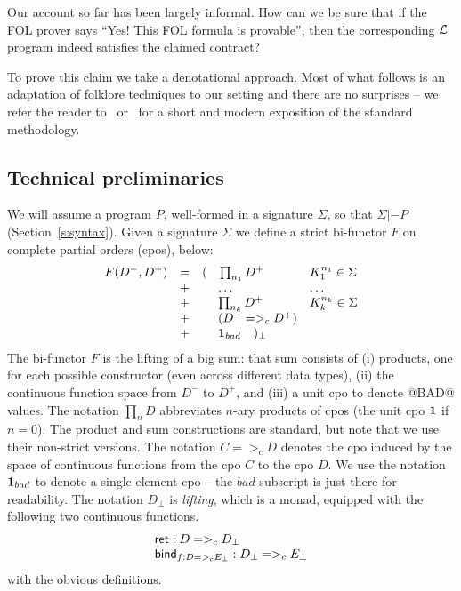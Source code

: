 Our account so far has been largely informal.  How can we be sure
that if the FOL prover says ``Yes!  This FOL formula is provable'', then
the corresponding $\cal L$ program indeed satisfies the claimed contract?

To prove this claim we take a denotational approach.  
Most of what follows is an adaptation of folklore techniques to
our setting and there are no surprises -- we refer the reader
to~\cite{winskel} or~\cite{benton+:coq-domains} for a short and modern
exposition of the standard methodology.

\subsection{Technical preliminaries}

We will assume a program $P$, well-formed in a signature $\Sigma$, so
that $\Sigma |- P$ (Section~\ref{s:syntax}).  
Given a signature $\Sigma$ we define a strict
bi-functor $F$ on complete partial orders (cpos), below:
\[\begin{array}{lclll}
  F(D^{-},D^{+}) & = & ( \quad{\prod_{n_1}{D^{+}}} & K_1^{n_1} \in \Sigma \\
               & + & \;\quad\ldots                    & \ldots \\
               & + & \;\quad{\prod_{n_k}{D^{+}}} & K_k^{n_k} \in \Sigma \\ 
               & + & \;\quad(D^{-} =>_c D^{+}) \\
               & + & \;\quad{\sf{\bf 1}}_{bad} \quad )_{\bot}
\end{array}\]
The bi-functor $F$ is the lifting of a big sum: that sum consists of 
(i) products, one for each possible constructor (even across different data types), (ii) the continuous
function space from $D^{-}$ to $D^{+}$, and (iii) a unit cpo to denote @BAD@ values. 
The notation $\prod_{n}{D}$ abbreviates $n$-ary products of cpos (the unit cpo ${\sf{\bf 1}}$ if $n = 0$). 
The product and sum constructions are standard, but note that we use their non-strict versions. 
The notation $C =>_c D$ denotes the cpo 
induced by the space of continuous functions from the cpo $C$ to the cpo $D$. We use 
the notation ${\sf{\bf 1}}_{bad}$ to 
denote a single-element cpo -- the $bad$ subscript is just there for readability. 
The notation $D_\bot$ is {\em lifting}, which is a monad, equipped with the following two continuous 
functions.
\[\begin{array}{l}
   \mathsf{ret}   : D =>_c D_\bot \\ 
   \mathsf{bind}_{f : D =>_c E_\bot} : D_\bot =>_c E_\bot
\end{array}\]
with the obvious definitions. 

